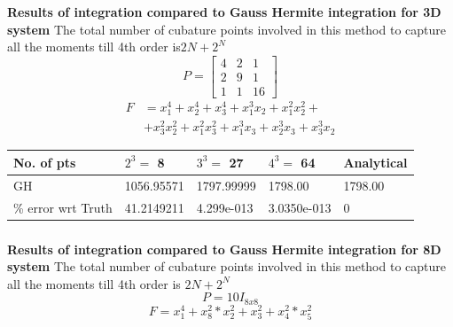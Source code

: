 \documentclass[11pt]{beamer}
\begin{document}
\begin{frame}
\frametitle{ }
{\bf Results of integration compared to Gauss Hermite integration for 3D system}\newline
The total number of cubature points involved in this method to capture all the moments till 4th order is{\bf  $2N+2^N$}
\[
 P = \begin{bmatrix}
       4 & 2 & 1    \\
       2 & 9 & 1     \\
       1 & 1 & 16
     \end{bmatrix}
\]
\begin{align*}
F&=x_1^4+x_2^4+x_3^4+x_1^3x_2+x_1^2x_2^2+\\
 &+x_3^2x_2^2+x_1^2x_3^2+x_1^3x_3+x_2^3x_3+x_3^3x_2
\end{align*}
\end{frame}
\begin{frame}
\tiny
\begin{center}
  \begin{tabular}{ | l | l | l | l | l | }
    \hline
       No. of pts 					& $2^3=$ 8 							& $3^3=$ 27 			  & $4^3=$ 64			 & Analytical       \\ \hline 
      GH          					&   1056.95571  			  & 1797.99999      & 1798.00     	 &   1798.00           \\ \hline
\% error wrt Truth       	  &   41.2149211    			&  4.299e-013  	  	& 3.0350e-013   &   0         \\ 
      \hline
  \end{tabular}
\end{center} 
\end{frame}
\begin{frame}
\frametitle{ }
{\bf Results of integration compared to Gauss Hermite integration for 8D system}\newline
The total number of cubature points involved in this method to capture all the moments till 4th order is $2N+2^N$
\begin{equation}
P=10I_{8x8}
\end{equation}
\begin{equation*}
F=x_1^4+x_8^2*x_2^2+x_3^2+x_4^2*x_5^2
\end{equation*}
\end{frame}
\end{document}
